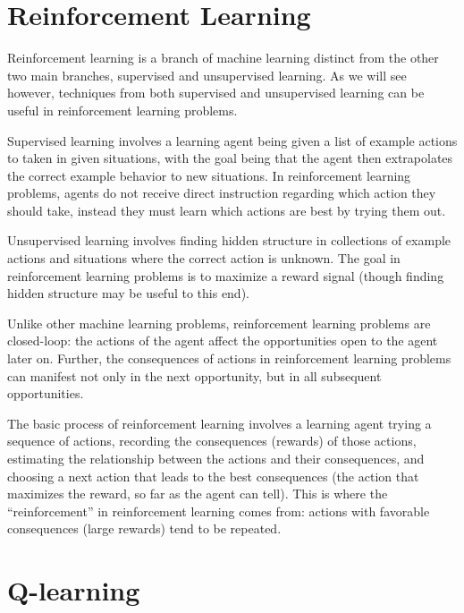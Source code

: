 \documentclass[12pt]{article}
\begin{document}
\section{Reinforcement Learning} %
\label{sec:reinforcement_learning}


Reinforcement learning is a branch of machine learning distinct from the other two main branches, supervised and unsupervised learning. As we will see however, techniques from both supervised and unsupervised learning can be useful in reinforcement learning problems.

Supervised learning involves a learning agent being given a list of example actions to taken in given situations, with the goal being that the agent then extrapolates the correct example behavior to new situations. In reinforcement learning problems, agents do not receive direct instruction regarding which action they should take, instead they must learn which actions are best by trying them out. 

Unsupervised learning involves finding hidden structure in collections of example actions and situations where the correct action is unknown. The goal in reinforcement learning problems is to maximize a reward signal (though finding hidden structure may be useful to this end).

Unlike other machine learning problems, reinforcement learning problems are closed-loop: the actions of the agent affect the opportunities open to the agent later on. Further, the consequences of actions in reinforcement learning problems can manifest not only in the next opportunity, but in all subsequent opportunities.


The basic process of reinforcement learning involves a learning agent trying a sequence of actions, recording the consequences (rewards) of those actions, estimating the relationship between the actions and their consequences, and choosing a next action that leads to the best consequences (the action that maximizes the reward, so far as the agent can tell). This is where the ``reinforcement'' in reinforcement learning comes from: actions with favorable consequences (large rewards) tend to be repeated.



\section{Q-learning} %
\label{sec:q_learning}
\end{document}
